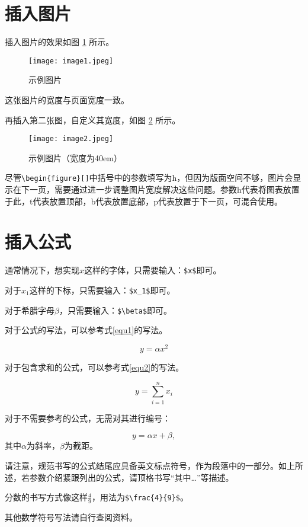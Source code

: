 \documentclass{GZHUMaster}
\begin{document}
\section{插入图片}
插入图片的效果如图 \ref{img1} 所示。\par
\begin{figure}[h]
  \centering
  \texttt{[image: image1.jpeg]}
  \caption{示例图片}
  \label{img1}
\end{figure}
这张图片的宽度与页面宽度一致。\par
再插入第二张图，自定义其宽度，如图 \ref{img2} 所示。\par
\begin{figure}[h]
  \centering
  \texttt{[image: image2.jpeg]}
  \caption{示例图片（宽度为40em）}
  \label{img2}
\end{figure}
尽管\verb|\begin{figure}[]|中括号中的参数填写为h，但因为版面空间不够，图片会显示在下一页，需要通过进一步调整图片宽度解决这些问题。参数h代表将图表放置于此，t代表放置顶部，b代表放置底部，p代表放置于下一页，可混合使用。
\section{插入公式}
通常情况下，想实现$x$这样的字体，只需要输入：\verb|$x$|即可。\par
对于$x_1$这样的下标，只需要输入：\verb|$x_1$|即可。\par
对于希腊字母$\beta$，只需要输入：\verb|$\beta$|即可。\par
对于公式的写法，可以参考式\ref{equ1}的写法。\par
\begin{equation}
  y=\alpha x^2 \tag*{（2-1）}
  \label{equ1}
\end{equation}\par
对于包含求和的公式，可以参考式\ref{equ2}的写法。\par
\begin{equation}
  y=\sum_{i=1}^{n}x_i \tag*{（2-2）}
  \label{equ2}
\end{equation}\par
对于不需要参考的公式，无需对其进行编号：\par
\[y=\alpha x + \beta,\]
其中$\alpha$为斜率，$\beta$为截距。\par
请注意，规范书写的公式结尾应具备英文标点符号，作为段落中的一部分。如上所述，若参数介绍紧跟列出的公式，请顶格书写“其中\dots”等描述。\par
分数的书写方式像这样$\frac{4}{9}$，用法为\verb|$\frac{4}{9}$|。\par
其他数学符号写法请自行查阅资料。
\end{document}
